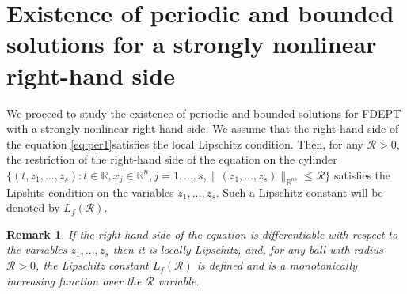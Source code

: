 \documentclass[
11pt,%
tightenlines,%
twoside,%
onecolumn,%
nofloats,%
nobibnotes,%
nofootinbib,%
superscriptaddress,%
noshowpacs,%
centertags,aps]%
{revtex4}
\newtheorem{remark}{Remark}
\begin{document}
\section{Existence of periodic and bounded solutions for a strongly nonlinear right-hand side}
We proceed to study the existence of periodic and bounded solutions for FDEPT with a strongly nonlinear right-hand side. We assume that the right-hand side of the equation \eqref{eq:per1}satisfies the local Lipschitz condition. Then, for any $\mathcal R>0$, the restriction of the right-hand side of the equation on the cylinder $\{(t,z_1,\ldots,z_s): t\in \mathbb R, x_j\in \mathbb R^n, j=1,\ldots,s, \|(z_1,\ldots,z_s)\|_{\mathbb R^{ns}}\leq \mathcal R\}$ satisfies the Lipshits condition on the variables $z_1,\ldots,z_s$. Such a Lipschitz constant will be denoted by $L_f(\mathcal R)$.
\begin{remark}
If the right-hand side of the equation is differentiable with respect to the variables $z_1,\ldots,z_s$ then it is locally Lipschitz, and, for any ball with radius $\mathcal R>0$, the Lipschitz constant $L_f(\mathcal R)$ is defined and is a monotonically increasing function over the $\mathcal R$ variable.
\end{remark}
\end{document}
